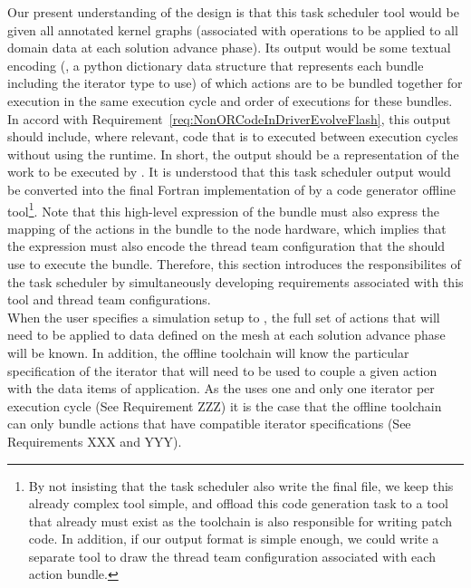 \documentclass{article}
\begin{document}
Our present understanding of the design is that this task scheduler tool would
be given all annotated kernel graphs (associated with operations to be applied to
all domain data at each solution advance phase).  Its output would be some
textual encoding (\eg, a python dictionary data structure that represents each
bundle including the iterator type to use) of which actions are to be bundled
together for execution in the same \OR execution cycle and order of executions for these
bundles. In accord with
Requirement~\ref{req:NonORCodeInDriverEvolveFlash}, this output should include,
where relevant, code that is to executed between \OR execution cycles without using
the runtime.  In short, the output should be a representation of the work to be
executed by .  It is understood that this task
scheduler output would be converted into the final Fortran implementation of
 by a code generator offline tool\footnote{By not
insisting that the task scheduler also write the final file, we keep this
already complex tool simple, and offload this code generation task to a tool that
already must exist as the toolchain is also responsible for writing patch code.
In addition, if our output format is simple enough, we could write a separate
tool to draw the thread team configuration associated with each action bundle.}.
Note that this high-level expression of the bundle must also express the mapping
of the actions in the bundle to the node hardware, which implies that the
expression must also encode the thread team configuration that the \OR should
use to execute the bundle.  Therefore, this section introduces the
responsibilites of the task scheduler by simultaneously developing requirements
associated with this tool and thread team configurations.\\

When the user specifies a simulation setup to \FlashOfTheFuture, the full set of
actions that will need to be applied to data defined on the mesh at each
solution advance phase will be known.  In addition, the offline toolchain will
know the particular specification of the iterator that will need to be
used to couple a given action with the data items of application.
As the \OR uses one and only one iterator per execution cycle (See
Requirement ZZZ) it is the case that the offline toolchain can only bundle
actions that have compatible iterator specifications (See Requirements XXX and
YYY).\\
\end{document}
